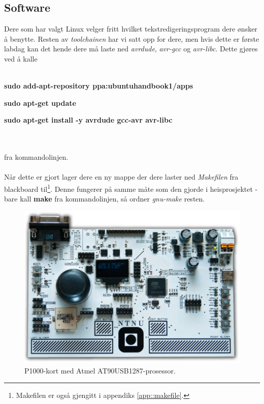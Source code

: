 \documentclass[11pt,a4paper]{article}
\def\e_learn_platform{blackboard}
\begin{document}
\subsection{Software}
Dere som har valgt Linux velger fritt hvilket tekstredigeringsprogram dere ønsker å benytte. Resten av \textit{toolchainen} har vi satt opp for dere, men hvis dette er første labdag kan det hende dere må laste ned \textit{avrdude}, \textit{avr-gcc} og \textit{avr-libc}. Dette gjøres ved å kalle\\
\\
\centerline{\textbf{sudo add-apt-repository ppa:ubuntuhandbook1/apps}}
\centerline{\textbf{sudo apt-get update}}
\centerline{\textbf{sudo apt-get install -y avrdude gcc-avr avr-libc}}\\
\\
fra kommandolinjen.\\
\\
Når dette er gjort lager dere en ny mappe der dere laster ned \textit{Makefilen} fra \e_learn_platform til\footnote{Makefilen er også gjengitt i appendiks \ref{app::makefile}.}. Denne fungerer på samme måte som den gjorde i heisprosjektet - bare kall \textbf{make} fra kommandolinjen, så ordner \textit{gnu-make} resten.
\begin{figure}[!h]
\centering
\includegraphics[width=0.8\linewidth]{p1000.png}
\caption{P1000-kort med Atmel AT90USB1287-prosessor.}
\label{p1000::card}
\end{figure}
\end{document}
